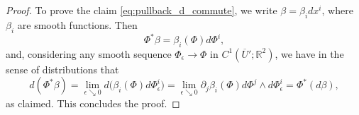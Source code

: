 \documentclass[10pt,a4paper]{amsart}
\newcommand{\R}{\mathbb{R}}
\begin{document}
\begin{proof}
        To prove the claim \eqref{eq:pullback_d_commute}, we write $\beta = \beta_i dx^i$, where $\beta_i$ are smooth functions. Then
        \begin{equation*}
            \Phi^*\beta = \beta_i(\Phi)d\Phi^i,
        \end{equation*}
        and, considering any smooth sequence $\Phi_\epsilon \to \Phi$ in $C^1(\overline U';\R^2)$, we have in the sense of distributions that 
        \begin{equation*}
            d(\Phi^*\beta) = \lim_{\epsilon\searrow 0} d\Big(\beta_i(\Phi)d\Phi^i_\epsilon\Big) = \lim_{\epsilon\searrow 0} \partial_j \beta_i(\Phi) d\Phi^j \wedge d\Phi^i_{\epsilon} = \Phi^*(d\beta),
        \end{equation*}
        as claimed. This concludes the proof.
    \end{proof}
\end{document}
